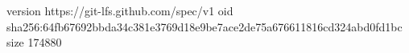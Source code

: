 version https://git-lfs.github.com/spec/v1
oid sha256:64fb67692bbda34c381e3769d18e9be7ace2de75a676611816cd324abd0fd1bc
size 174880
